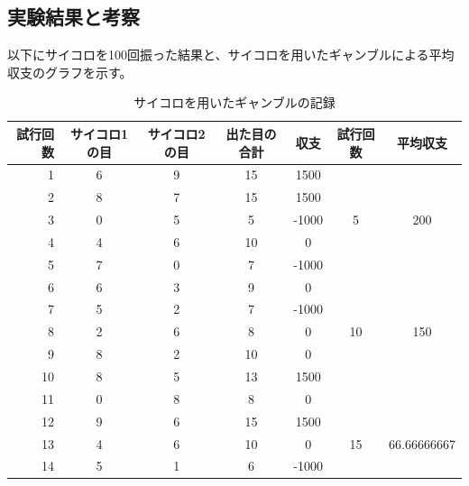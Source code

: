 \documentclass[12pt]{jarticle}
\begin{document}
\subsection{実験結果と考察}
以下にサイコロを100回振った結果と、サイコロを用いたギャンブルによる平均収支のグラフを示す。

\clearpage
\begin{table}
    \caption{サイコロを用いたギャンブルの記録}
    \begin{tabular}[h]{|r|c|c|c|c|c|c|}
        \hline
        試行回数 & サイコロ1の目 & サイコロ2の目 & 出た目の合計 & 収支  & 試行回数 & 平均収支     \\ \hline
        1        & 6             & 9             & 15           & 1500  &          &              \\
        2        & 8             & 7             & 15           & 1500  &          &              \\
        3        & 0             & 5             & 5            & -1000 & 5        & 200          \\
        4        & 4             & 6             & 10           & 0     &          &              \\
        5        & 7             & 0             & 7            & -1000 &          &              \\
        \hline6  & 6             & 3             & 9            & 0     &          &              \\
        7        & 5             & 2             & 7            & -1000 &          &              \\
        8        & 2             & 6             & 8            & 0     & 10       & 150          \\
        9        & 8             & 2             & 10           & 0     &          &              \\
        10       & 8             & 5             & 13           & 1500  &          &              \\
        \hline11 & 0             & 8             & 8            & 0     &          &              \\
        12       & 9             & 6             & 15           & 1500  &          &              \\
        13       & 4             & 6             & 10           & 0     & 15       & 66.66666667  \\
        14       & 5             & 1             & 6            & -1000 &          &              \\

\end{tabular}
\end{table}
\end{document}
